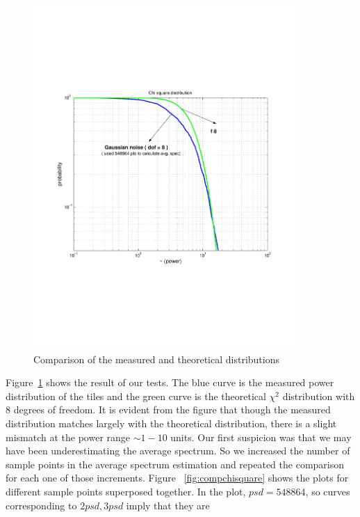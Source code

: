\begin{figure}[h]
\begin{center}
\includegraphics[width=0.9\textwidth]{figures/compchisquare_psd}
\caption{Comparison of the measured and theoretical distributions }
\label{fig:compchisquare_psd}
\end{center}
\end{figure}
Figure~\ref{fig:compchisquare_psd} shows the result of our tests. 
The blue curve is the measured power distribution of the tiles and the green
curve is the theoretical $\chi^2$ distribution with $8$ degrees of freedom.
 It is evident from the figure that though the measured distribution 
matches largely with the theoretical distribution,  there is a slight mismatch
at the power range $ \sim 1 - 10$ units.  Our 
first suspicion was that we may have been underestimating the average spectrum. 
 So we increased the number of sample points in the average spectrum 
estimation and repeated the comparison for each one of those increments. 
Figure ~\ref{fig:compchisquare} shows the plots for different sample 
points superposed together.  In the plot,  $psd = 548864$,  
so curves corresponding to $2psd,  3psd$  imply that they are 
